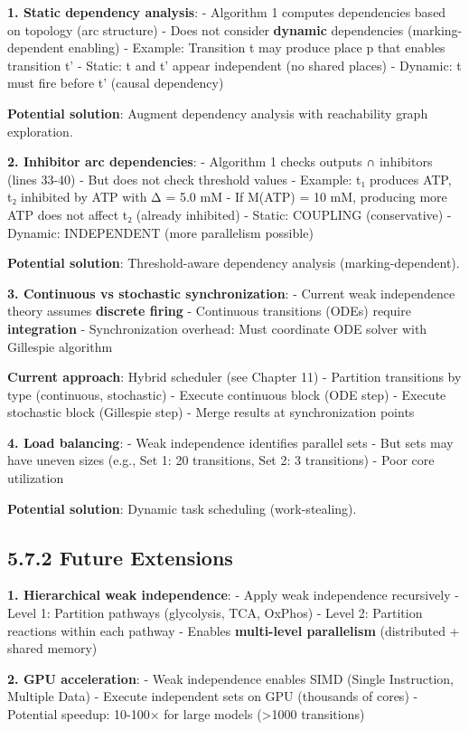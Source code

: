 \textbf{1. Static dependency analysis}: - Algorithm 1 computes
dependencies based on topology (arc structure) - Does not consider
\textbf{dynamic} dependencies (marking-dependent enabling) - Example:
Transition t may produce place p that enables transition t' - Static: t
and t' appear independent (no shared places) - Dynamic: t must fire
before t' (causal dependency)

\textbf{Potential solution}: Augment dependency analysis with
reachability graph exploration.

\textbf{2. Inhibitor arc dependencies}: - Algorithm 1 checks outputs ∩
inhibitors (lines 33-40) - But does not check threshold values -
Example: t₁ produces ATP, t₂ inhibited by ATP with Δ = 5.0 mM - If
M(ATP) = 10 mM, producing more ATP does not affect t₂ (already
inhibited) - Static: COUPLING (conservative) - Dynamic: INDEPENDENT
(more parallelism possible)

\textbf{Potential solution}: Threshold-aware dependency analysis
(marking-dependent).

\textbf{3. Continuous vs stochastic synchronization}: - Current weak
independence theory assumes \textbf{discrete firing} - Continuous
transitions (ODEs) require \textbf{integration} - Synchronization
overhead: Must coordinate ODE solver with Gillespie algorithm

\textbf{Current approach}: Hybrid scheduler (see Chapter 11) - Partition
transitions by type (continuous, stochastic) - Execute continuous block
(ODE step) - Execute stochastic block (Gillespie step) - Merge results
at synchronization points

\textbf{4. Load balancing}: - Weak independence identifies parallel sets
- But sets may have uneven sizes (e.g., Set 1: 20 transitions, Set 2: 3
transitions) - Poor core utilization

\textbf{Potential solution}: Dynamic task scheduling (work-stealing).

\hypertarget{future-extensions}{%
\subsection{5.7.2 Future Extensions}\label{future-extensions}}

\textbf{1. Hierarchical weak independence}: - Apply weak independence
recursively - Level 1: Partition pathways (glycolysis, TCA, OxPhos) -
Level 2: Partition reactions within each pathway - Enables
\textbf{multi-level parallelism} (distributed + shared memory)

\textbf{2. GPU acceleration}: - Weak independence enables SIMD (Single
Instruction, Multiple Data) - Execute independent sets on GPU (thousands
of cores) - Potential speedup: 10-100× for large models
(\textgreater1000 transitions)

